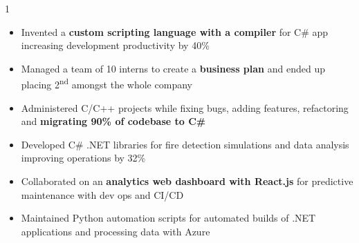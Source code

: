 \documentclass[11pt,a4paper,ragged2e]{altacv}
\begin{document}
\begin{paracol}{1}
\begin{itemize}
\item Invented a \textbf{custom scripting language with a compiler} for C\# app increasing development productivity by 40\%
\item Managed a team of 10 interns to create a \textbf{business plan} and ended up placing 2\textsuperscript{nd} amongst the whole company
\item Administered C/C++ projects while fixing bugs, adding features, refactoring and \textbf{migrating 90\% of codebase to C\#}
\item Developed C\# .NET libraries for fire detection simulations and data analysis improving operations by 32\%
\item Collaborated on an \textbf{analytics web dashboard with React.js} for predictive maintenance with dev ops and CI/CD
\item Maintained Python automation scripts for automated builds of .NET applications and processing data with Azure
\end{itemize}
\tightdivider


\end{paracol}
\end{document}
